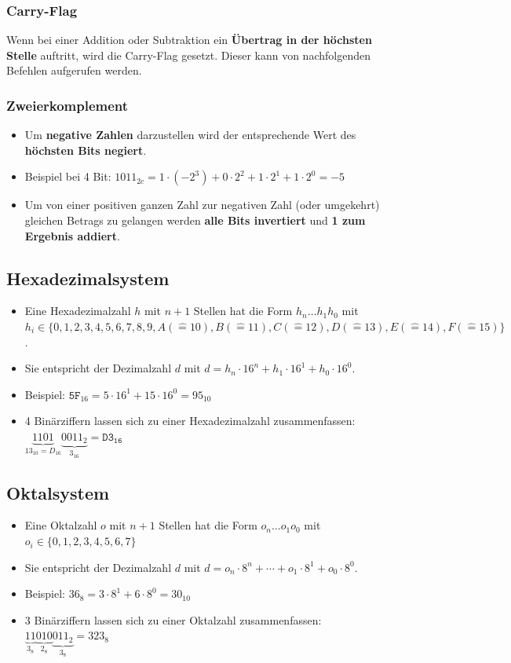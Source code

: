 \documentclass[12pt]{article}
\begin{document}
\subsubsection{Carry-Flag}
Wenn bei einer Addition oder Subtraktion ein \textbf{Übertrag in der höchsten Stelle} auftritt, wird die Carry-Flag gesetzt.
Dieser kann von nachfolgenden Befehlen aufgerufen werden.
\subsubsection{Zweierkomplement}
\begin{itemize}[leftmargin=*]
    \item[] Um \textbf{negative Zahlen} darzustellen wird der entsprechende Wert des \textbf{höchsten Bits negiert}.
    \item[] Beispiel bei 4 Bit: $1011_{2c} = 1 \cdot (-2^3) + 0 \cdot 2^2 + 1 \cdot 2^1 + 1 \cdot 2^0 = -5$
    \item[] Um von einer positiven ganzen Zahl zur negativen Zahl (oder umgekehrt) gleichen Betrags zu gelangen werden \textbf{alle Bits invertiert} und \textbf{1 zum Ergebnis addiert}.
\end{itemize}

\subsection{Hexadezimalsystem}
\begin{itemize}[leftmargin=*]
    \item[] Eine Hexadezimalzahl $h$ mit $n + 1$ Stellen hat die Form $h_n \dots h_1 h_0$ mit $h_i \in \{0, 1, 2, 3, 4, 5, 6, 7, 8, 9, A(\widehat{=}10), B(\widehat{=}11), C(\widehat{=}12), D(\widehat{=}13), E(\widehat{=}14), F(\widehat{=}15)\}$.
    \item[] Sie entspricht der Dezimalzahl $d$ mit $d = h_n \cdot 16^n + h_1 \cdot 16^1 + h_0 \cdot 16^0$.
    \item[] Beispiel: $\mathtt{5F}_{16} = 5 \cdot 16^1 + 15 \cdot 16^0 = 95_{10}$
    \item[] 4 Binärziffern lassen sich zu einer Hexadezimalzahl zusammenfassen:\\$\underbrace{1101}_{13_{10}=D_{16}} \underbrace{0011_2}_{3_{16}} = \mathtt{D3_{16}}$
\end{itemize}
\subsection{Oktalsystem}
\begin{itemize}[leftmargin=*]
    \item[] Eine Oktalzahl $o$ mit $n + 1$ Stellen hat die Form $o_n \dots o_1 o_0$ mit $o_i \in \{0, 1, 2, 3, 4, 5, 6, 7\}$
    \item[] Sie entspricht der Dezimalzahl $d$ mit $d = o_n \cdot 8^n + \cdots + o_1 \cdot 8^1 + o_0 \cdot 8^0$.
    \item[] Beispiel: $36_8 = 3 \cdot 8^1 + 6 \cdot 8^0 = 30_{10}$
    \item[] 3 Binärziffern lassen sich zu einer Oktalzahl zusammenfassen:\\$\underbrace{11}_{3_8} \underbrace{010}_{2_8} \underbrace{011_2}_{3_8} = 323_8$
\end{itemize}
\end{document}
